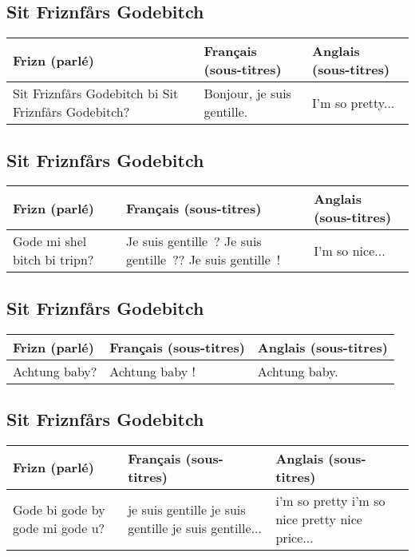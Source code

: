 
\subsection*{Sit Friznfårs Godebitch}
\begin{tabular}{|p{2in}|p{2in}|p{2in}|}\hline
Frizn (parlé) & Français (sous-titres) & Anglais (sous-titres) \\\hline
Sit Friznfårs Godebitch bi Sit Friznfårs Godebitch? &
Bonjour, je suis gentille. &
I'm so pretty... \\\hline
\end{tabular}\par
\subsection*{Sit Friznfårs Godebitch}
\begin{tabular}{|p{2in}|p{2in}|p{2in}|}\hline
Frizn (parlé) & Français (sous-titres) & Anglais (sous-titres) \\\hline
Gode mi shel bitch bi tripn? &
Je suis gentille~? Je suis gentille~?? Je suis gentille~! &
I'm so nice... \\\hline
\end{tabular}\par
\subsection*{Sit Friznfårs Godebitch}
\begin{tabular}{|p{2in}|p{2in}|p{2in}|}\hline
Frizn (parlé) & Français (sous-titres) & Anglais (sous-titres) \\\hline
Achtung baby? &
Achtung baby ! &
Achtung baby. \\\hline
\end{tabular}\par
\subsection*{Sit Friznfårs Godebitch}
\begin{tabular}{|p{2in}|p{2in}|p{2in}|}\hline
Frizn (parlé) & Français (sous-titres) & Anglais (sous-titres) \\\hline
Gode bi gode by gode mi gode u? &
je suis gentille je suis gentille je suis gentille... &
i'm so pretty i'm so nice pretty nice price...  \\\hline
\end{tabular}\par
